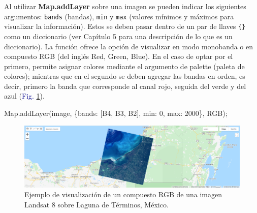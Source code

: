 \documentclass[
  12pt,
  letterpaper,
  twoside]{book}
\newenvironment{Shaded}{\begin{snugshade}}{\end{snugshade}}
\newcommand{\BuiltInTok}[1]{#1}
\newcommand{\DataTypeTok}[1]{\textcolor[rgb]{0.00,0.00,0.00}{#1}}
\newcommand{\DecValTok}[1]{\textcolor[rgb]{0.28,0.53,0.93}{#1}}
\newcommand{\FunctionTok}[1]{\textcolor[rgb]{0.48,0.12,0.64}{#1}}
\newcommand{\NormalTok}[1]{#1}
\newcommand{\OperatorTok}[1]{\textcolor[rgb]{0.00,0.00,0.00}{#1}}
\newcommand{\StringTok}[1]{\textcolor[rgb]{0.87,0.29,0.22}{#1}}
\newcommand\boldpurple[1]{\textcolor{darkpurple}{\textbf{#1}}}
\begin{document}
Al utilizar \boldpurple{Map.addLayer} sobre una imagen se pueden indicar los siguientes argumentos: \texttt{bands} (bandas), \texttt{min} y \texttt{max} (valores mínimos y máximos para visualizar la información). Estos se deben pasar dentro de un par de llaves \texttt{\{\}} como un diccionario (ver Capítulo 5 para una descripción de lo que es un diccionario). La función ofrece la opción de visualizar en modo monobanda o en compuesto RGB (del inglés Red, Green, Blue). En el caso de optar por el primero, permite asignar colores mediante el argumento de palette (paleta de colores); mientras que en el segundo se deben agregar las bandas en orden, es decir, primero la banda que corresponde al canal rojo, seguida del verde y del azul (\textcolor{darkblue}{Fig.} \ref{fig:f32}).

\begin{Shaded}
\begin{Highlighting}[]
\BuiltInTok{Map}\OperatorTok{.}\FunctionTok{addLayer}\NormalTok{(image}\OperatorTok{,}\NormalTok{ \{}\DataTypeTok{bands}\OperatorTok{:}\NormalTok{ [}\StringTok{\textquotesingle{}B4\textquotesingle{}}\OperatorTok{,} \StringTok{\textquotesingle{}B3\textquotesingle{}}\OperatorTok{,} \StringTok{\textquotesingle{}B2\textquotesingle{}}\NormalTok{]}\OperatorTok{,} 
                      \DataTypeTok{min}\OperatorTok{:} \DecValTok{0}\OperatorTok{,} \DataTypeTok{max}\OperatorTok{:} \DecValTok{2000}\NormalTok{\}}\OperatorTok{,} 
                      \StringTok{\textquotesingle{}RGB\textquotesingle{}}\NormalTok{)}\OperatorTok{;}
\end{Highlighting}
\end{Shaded}

\begin{figure}[H]

{\centering \includegraphics[width=0.95\linewidth]{Img/LTerminos} 

}

\caption{Ejemplo de visualización de un compuesto RGB de una imagen Landsat 8 sobre Laguna de Términos, México.}\label{fig:f32}
\end{figure}
\end{document}
